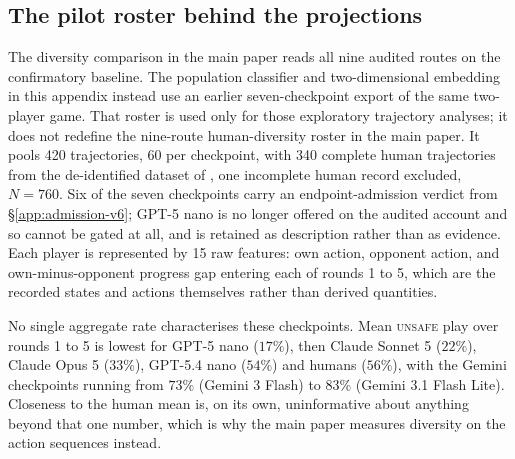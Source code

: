 \documentclass[sigconf,anonymous]{aamas}
\newcommand{\Unsafe}{\textsc{unsafe}}
\begin{document}

\subsection{The pilot roster behind the projections}
\label{app:diversity-pilot}

The diversity comparison in the main paper reads all nine audited routes on the
confirmatory baseline. The population classifier and two-dimensional embedding
in this appendix instead use an earlier seven-checkpoint export of the same
two-player game. That roster is used only for those exploratory trajectory
analyses; it does not redefine the nine-route human-diversity roster in the
main paper. It pools 420 trajectories, 60 per checkpoint, with 340 complete human
trajectories from the de-identified dataset of
\citet{falling_behind_unsafe}, one incomplete human record excluded, $N=760$.
Six of the seven checkpoints carry an endpoint-admission verdict from
\S\ref{app:admission-v6}; GPT-5 nano is no longer offered on the audited
account and so cannot be gated at all, and is retained as description rather
than as evidence. Each player is represented by 15 raw features: own action,
opponent action, and own-minus-opponent progress gap entering each of rounds 1
to 5, which are the recorded states and actions themselves rather than derived
quantities.

No single aggregate rate characterises these checkpoints. Mean \Unsafe{} play
over rounds 1 to 5 is lowest for GPT-5 nano ($17\%$), then Claude Sonnet 5
($22\%$), Claude Opus 5 ($33\%$), GPT-5.4 nano ($54\%$) and humans ($56\%$),
with the Gemini checkpoints running from $73\%$ (Gemini 3 Flash) to $83\%$
(Gemini 3.1 Flash Lite). Closeness to the human mean is, on its own,
uninformative about anything beyond that one number, which is why the main
paper measures diversity on the action sequences instead.
\end{document}
